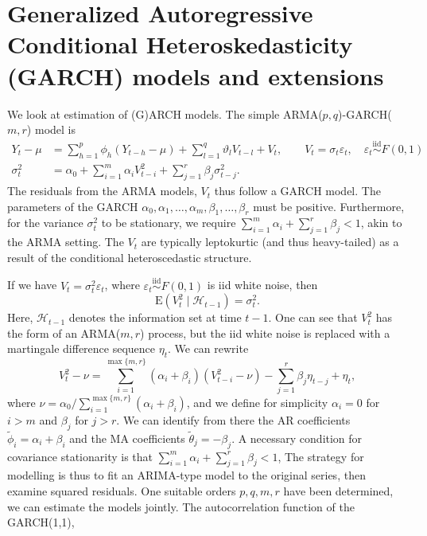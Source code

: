 \documentclass[]{book}
\begin{document}
\hypertarget{generalized-autoregressive-conditional-heteroskedasticity-garch-models-and-extensions}{%
\section{Generalized Autoregressive Conditional Heteroskedasticity
(GARCH) models and
extensions}\label{generalized-autoregressive-conditional-heteroskedasticity-garch-models-and-extensions}}

We look at estimation of (G)ARCH models. The simple
ARMA(\(p, q\))-GARCH(\(m, r\)) model is \[
\begin{align*}
Y_t -\mu &=   \sum_{h = 1}^p \phi_h (Y_{t-h}-\mu)+ \sum_{l = 1}^q \vartheta_lV_{t-l}+ V_t, \qquad V_t = \sigma_t\varepsilon_t, \quad\varepsilon_t\stackrel{\mathrm{iid}}{\sim} F(0, 1) \\ \sigma^2_t &= \alpha_0+\sum_{i = 1}^m \alpha_iV_{t-i}^2 + \sum_{j = 1}^r \beta_j\sigma^2_{t-j}. 
\end{align*}
\] The residuals from the ARMA models, \(V_t\) thus follow a GARCH
model. The parameters of the GARCH
\(\alpha_0, \alpha_1, \ldots, \alpha_m, \beta_1, \ldots, \beta_r\) must
be positive. Furthermore, for the variance \(\sigma^2_t\) to be
stationary, we require
\(\sum_{i=1}^m \alpha_i + \sum_{j=1}^r \beta_j <1\), akin to the ARMA
setting. The \(V_t\) are typically leptokurtic (and thus heavy-tailed)
as a result of the conditional heteroscedastic structure.

If we have \(V_t=\sigma_t^2\varepsilon_t\), where
\(\varepsilon_t \stackrel{\mathrm{iid}}{\sim}F(0, 1)\) is iid white
noise, then \[\mathrm{E}(V_t^2 \mid \mathcal{H}_{t-1}) = \sigma^2_t.\]
Here, \(\mathcal{H}_{t-1}\) denotes the information set at time \(t-1\).
One can see that \(V_t^2\) has the form of an ARMA(\(m, r\)) process,
but the iid white noise is replaced with a martingale difference
sequence \(\eta_t\). We can rewrite
\[V_t^2 -\nu = \sum_{i=1}^{\max\{m, r\}} (\alpha_i+\beta_i)(V_{t-i}^2-\nu) - \sum_{j=1}^r \beta_j \eta_{t-j} + \eta_t,\]
where \(\nu = \alpha_0/ \sum_{i=1}^{\max\{m, r\}}(\alpha_i+\beta_i)\),
and we define for simplicity \(\alpha_i=0\) for \(i>m\) and \(\beta_j\)
for \(j>r\). We can identify from there the AR coefficients
\(\tilde{\phi}_i=\alpha_i+\beta_i\) and the MA coefficients
\(\tilde{\theta}_j=-\beta_j\). A necessary condition for covariance
stationarity is that
\(\sum_{i=1}^m \alpha_i + \sum_{j=1}^r \beta_j <1\), The strategy for
modelling is thus to fit an ARIMA-type model to the original series,
then examine squared residuals. One suitable orders \(p, q, m, r\) have
been determined, we can estimate the models jointly. The autocorrelation
function of the GARCH(1,1),
\end{document}
